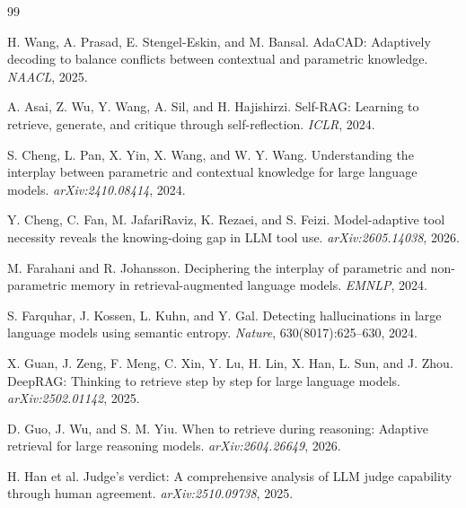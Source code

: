 \documentclass[10pt,letterpaper]{article}
\begin{document}
\begin{thebibliography}{99}\setlength{\itemsep}{1pt}

H. Wang, A. Prasad, E. Stengel-Eskin, and M. Bansal.
{AdaCAD}: Adaptively decoding to balance conflicts between contextual and parametric knowledge.
\emph{NAACL}, 2025.

A. Asai, Z. Wu, Y. Wang, A. Sil, and H. Hajishirzi.
Self-{RAG}: Learning to retrieve, generate, and critique through self-reflection.
\emph{ICLR}, 2024.

S. Cheng, L. Pan, X. Yin, X. Wang, and W. Y. Wang.
Understanding the interplay between parametric and contextual knowledge for large language models.
\emph{arXiv:2410.08414}, 2024.

Y. Cheng, C. Fan, M. JafariRaviz, K. Rezaei, and S. Feizi.
Model-adaptive tool necessity reveals the knowing-doing gap in {LLM} tool use.
\emph{arXiv:2605.14038}, 2026.

M. Farahani and R. Johansson.
Deciphering the interplay of parametric and non-parametric memory in retrieval-augmented language models.
\emph{EMNLP}, 2024.

S. Farquhar, J. Kossen, L. Kuhn, and Y. Gal.
Detecting hallucinations in large language models using semantic entropy.
\emph{Nature}, 630(8017):625--630, 2024.

X. Guan, J. Zeng, F. Meng, C. Xin, Y. Lu, H. Lin, X. Han, L. Sun, and J. Zhou.
{DeepRAG}: Thinking to retrieve step by step for large language models.
\emph{arXiv:2502.01142}, 2025.

D. Guo, J. Wu, and S. M. Yiu.
When to retrieve during reasoning: Adaptive retrieval for large reasoning models.
\emph{arXiv:2604.26649}, 2026.

H. Han et al.
Judge's verdict: A comprehensive analysis of {LLM} judge capability through human agreement.
\emph{arXiv:2510.09738}, 2025.


\end{thebibliography}
\end{document}

